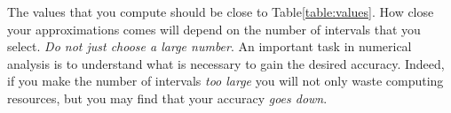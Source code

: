 The values that you compute should be close to Table\xspace\ref{table:values}.
How close your approximations comes will depend on the number of intervals that
you select. \emph{Do not just choose a large number}. An important task in
numerical analysis is to understand what is necessary to gain the desired
accuracy. Indeed, if you make the number of intervals \emph{too large} you will
not only waste computing resources, but you may find that your accuracy
\emph{goes down}.
